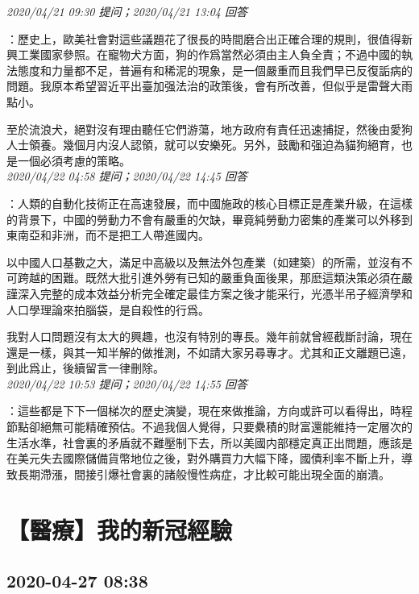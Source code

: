 \documentclass[twocolumn]{ctexart}
\begin{document}
\textit{\hfill\noindent\small 2020/04/21 09:30 提问；2020/04/21 13:04 回答}

：歷史上，歐美社會對這些議題花了很長的時間磨合出正確合理的規則，很值得新興工業國家參照。在寵物犬方面，狗的作爲當然必須由主人負全責；不過中國的執法態度和力量都不足，普遍有和稀泥的現象，是一個嚴重而且我們早已反復詬病的問題。我原本希望習近平出臺加强法治的政策後，會有所改善，但似乎是雷聲大雨點小。

至於流浪犬，絕對沒有理由聽任它們游蕩，地方政府有責任迅速捕捉，然後由愛狗人士領養。幾個月内沒人認領，就可以安樂死。另外，鼓勵和强迫為貓狗絕育，也是一個必須考慮的策略。
\\

\textit{\hfill\noindent\small 2020/04/22 04:58 提问；2020/04/22 14:45 回答}

：人類的自動化技術正在高速發展，而中國施政的核心目標正是產業升級，在這樣的背景下，中國的勞動力不會有嚴重的欠缺，畢竟純勞動力密集的產業可以外移到東南亞和非洲，而不是把工人帶進國内。

以中國人口基數之大，滿足中高級以及無法外包產業（如建築）的所需，並沒有不可跨越的困難。既然大批引進外勞有已知的嚴重負面後果，那麽這類決策必須在嚴謹深入完整的成本效益分析完全確定最佳方案之後才能采行，光憑半吊子經濟學和人口學理論來拍腦袋，是自殺性的行爲。

我對人口問題沒有太大的興趣，也沒有特別的專長。幾年前就曾經截斷討論，現在還是一樣，與其一知半解的做推測，不如請大家另尋專才。尤其和正文離題已遠，到此爲止，後續留言一律刪除。
\\

\textit{\hfill\noindent\small 2020/04/22 10:53 提问；2020/04/22 14:55 回答}

：這些都是下下一個梯次的歷史演變，現在來做推論，方向或許可以看得出，時程節點卻絕無可能精確預估。不過我個人覺得，只要纍積的財富還能維持一定層次的生活水準，社會裏的矛盾就不難壓制下去，所以美國内部穩定真正出問題，應該是在美元失去國際儲備貨幣地位之後，對外購買力大幅下降，國債利率不斷上升，導致長期滯漲，間接引爆社會裏的諸般慢性病症，才比較可能出現全面的崩潰。
\\


\section{【醫療】我的新冠經驗}
\subsection{2020-04-27 08:38}
\end{document}
